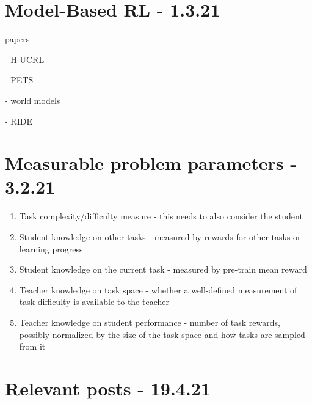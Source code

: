 \documentclass[letterpaper]{article}
\theoremstyle{definition}
\begin{document}
\section{Model-Based RL - 1.3.21} \label{sec:mbrl}

papers

\cite{Curi2020} - H-UCRL

\cite{Chua2018} - PETS

\cite{Ha2018} - world models

\cite{Raileanu2020} - RIDE

\section{Measurable problem parameters - 3.2.21} \label{sec:experiments}

\begin{enumerate}
	\item Task complexity/difficulty measure - this needs to also consider the student
	\item Student knowledge on other tasks - measured by rewards for other tasks or learning progress
	\item Student knowledge on the current task - measured by pre-train mean reward
	\item Teacher knowledge on task space - whether a well-defined measurement of task difficulty is available to the teacher
	\item Teacher knowledge on student performance - number of task rewards, possibly normalized by the size of the task space and how tasks are sampled from it
\end{enumerate}

\section{Relevant posts - 19.4.21} \label{sec:blogs}
\end{document}
